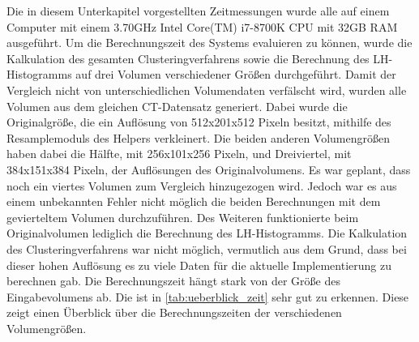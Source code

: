 Die in diesem Unterkapitel vorgestellten Zeitmessungen wurde alle auf einem Computer mit einem 3.70GHz  Intel Core(TM) i7-8700K CPU mit 32GB RAM ausgeführt.
\newline
Um die Berechnungszeit des Systems evaluieren zu können, wurde die Kalkulation des gesamten Clusteringverfahrens sowie die Berechnung des LH-Histogramms auf drei Volumen verschiedener Größen durchgeführt. Damit der Vergleich nicht von unterschiedlichen Volumendaten verfälscht wird, wurden alle Volumen aus dem gleichen CT-Datensatz generiert.
\newline
Dabei wurde die Originalgröße, die ein Auflösung von 512x201x512 Pixeln besitzt, mithilfe des Resamplemoduls des Helpers verkleinert. Die beiden anderen Volumengrößen haben dabei die  Hälfte, mit 256x101x256 Pixeln, und Dreiviertel, mit 384x151x384 Pixeln, der Auflösungen des Originalvolumens.
\newline
Es war geplant, dass noch ein viertes Volumen zum Vergleich hinzugezogen wird. Jedoch war es aus einem unbekannten Fehler nicht möglich die beiden Berechnungen mit dem gevierteltem Volumen durchzuführen.
\newline
Des Weiteren funktionierte beim Originalvolumen lediglich die Berechnung des LH-Histogramms. Die Kalkulation des Clusteringverfahrens war nicht möglich, vermutlich aus dem Grund, dass bei dieser hohen Auflösung es zu viele Daten für die aktuelle Implementierung zu berechnen gab.
\newline
Die Berechnungszeit hängt stark von der Größe des Eingabevolumens ab. Die ist in \autoref{tab:ueberblick_zeit} sehr gut zu erkennen. Diese zeigt einen Überblick über die  Berechnungszeiten der verschiedenen Volumengrößen.


\begin{table}[h]
\centering
{}
\caption{Überblick über die Berechnungszeiten der verschiedenen Volumengrößen}
\label{tab:ueberblick_zeit}
\end{table}


